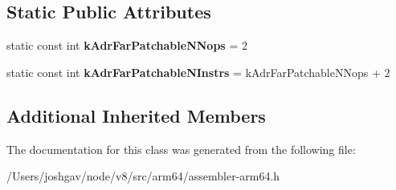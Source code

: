 \subsection*{Static Public Attributes}
\begin{DoxyCompactItemize}
\item 
static const int {\bfseries k\+Adr\+Far\+Patchable\+N\+Nops} = 2\hypertarget{classv8_1_1internal_1_1_patching_assembler_a0ca02b2f7efd2e4f8815be5f40444050}{}\label{classv8_1_1internal_1_1_patching_assembler_a0ca02b2f7efd2e4f8815be5f40444050}

\item 
static const int {\bfseries k\+Adr\+Far\+Patchable\+N\+Instrs} = k\+Adr\+Far\+Patchable\+N\+Nops + 2\hypertarget{classv8_1_1internal_1_1_patching_assembler_a1249d671547bade950e5a3b53086a790}{}\label{classv8_1_1internal_1_1_patching_assembler_a1249d671547bade950e5a3b53086a790}

\end{DoxyCompactItemize}
\subsection*{Additional Inherited Members}


The documentation for this class was generated from the following file\+:\begin{DoxyCompactItemize}
\item 
/\+Users/joshgav/node/v8/src/arm64/assembler-\/arm64.\+h\end{DoxyCompactItemize}
